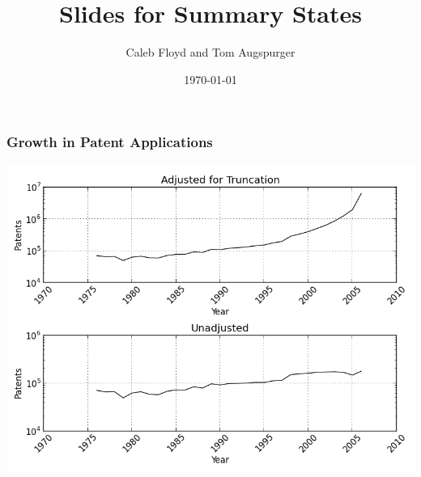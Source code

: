 \documentclass{beamer}
\title{Slides for Summary States}
\author{Caleb Floyd and Tom Augspurger}
\date{\today}
\begin{document}
\frame{\titlepage}

\section[Outline]{}
\frame{\tableofcontents}


\begin{frame}[t]\frametitle{Growth in Patent Applications} 

  \begin{center}
      \includegraphics[scale=.5]{grant_year.png}
      \label{fig:}
  \end{center}

\end{frame}
\end{document}
